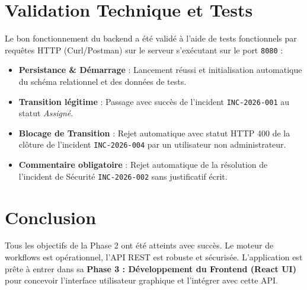 \documentclass[12pt,a4paper]{article}
\begin{document}
\section{Validation Technique et Tests}
Le bon fonctionnement du backend a été validé à l'aide de tests fonctionnels par requêtes HTTP (Curl/Postman) sur le serveur s'exécutant sur le port \texttt{8080} :
\begin{itemize}
    \item \textbf{Persistance \& Démarrage} : Lancement réussi et initialisation automatique du schéma relationnel et des données de tests.
    \item \textbf{Transition légitime} : Passage avec succès de l'incident \texttt{INC-2026-001} au statut \textit{Assigné}.
    \item \textbf{Blocage de Transition} : Rejet automatique avec statut HTTP 400 de la clôture de l'incident \texttt{INC-2026-004} par un utilisateur non administrateur.
    \item \textbf{Commentaire obligatoire} : Rejet automatique de la résolution de l'incident de Sécurité \texttt{INC-2026-002} sans justificatif écrit.
\end{itemize}

\section{Conclusion}
Tous les objectifs de la Phase 2 ont été atteints avec succès. Le moteur de workflows est opérationnel, l'API REST est robuste et sécurisée. L'application est prête à entrer dans sa \textbf{Phase 3 : Développement du Frontend (React UI)} pour concevoir l'interface utilisateur graphique et l'intégrer avec cette API.
\end{document}
